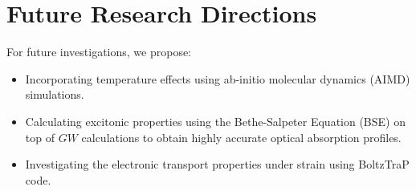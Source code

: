 \section{Future Research Directions}
For future investigations, we propose:
\begin{itemize}
    \item Incorporating temperature effects using ab-initio molecular dynamics (AIMD) simulations.
    \item Calculating excitonic properties using the Bethe-Salpeter Equation (BSE) on top of $GW$ calculations to obtain highly accurate optical absorption profiles.
    \item Investigating the electronic transport properties under strain using BoltzTraP code.
\end{itemize}
